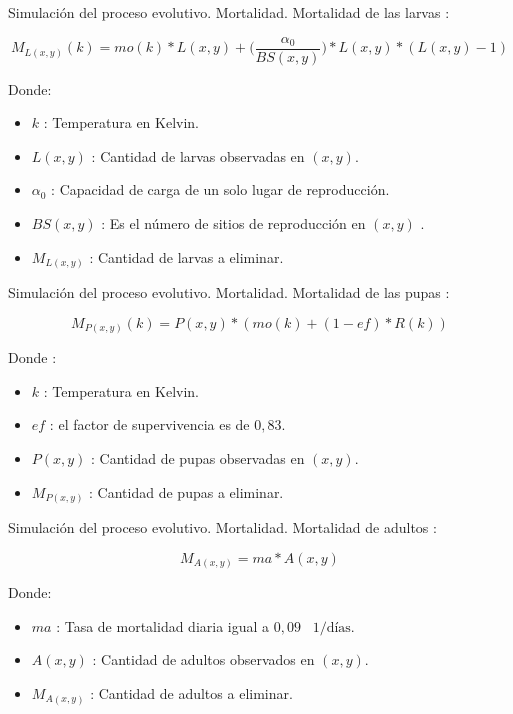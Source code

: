 \begin{frame}[c]{Simulación del proceso evolutivo. Mortalidad.}
Mortalidad de las larvas :
  \begin{center}
      \begin{equation}
      M_{L(x,y)}(k) = mo(k) * L(x,y) + \bigg(\frac{\alpha _{0}}{BS(x,y)}\bigg) * L(x,y) *(L(x,y) - 1)
    \end{equation}
  \end{center}
  Donde:
 \begin{itemize}
      \item $k$ : Temperatura en Kelvin.
      \item $L(x, y)$ : Cantidad de larvas observadas en $(x,y)$.
      \item $\alpha _{0}$ : Capacidad de carga de un solo lugar de reproducción.
      \item $BS(x,y)$ : Es el número de sitios de reproducción en $(x,y)$ .
      \item $M_{L(x,y)}$ : Cantidad de larvas a eliminar.
    \end{itemize}
\end{frame}

\begin{frame}[c]{Simulación del proceso evolutivo. Mortalidad.}
Mortalidad de las pupas :
\begin{center}
  \begin{equation}
      M_{P(x,y)}(k) = P(x,y) * (mo(k) + (1 - ef) * R(k))
  \end{equation}
\end{center}
Donde :
  \begin{itemize}
    \item $k$ : Temperatura en Kelvin.
    \item $ef$ : el factor de supervivencia es de $0,83$.
    \item $P(x, y)$ : Cantidad de pupas observadas en $(x,y)$.
    \item $M_{P(x,y)}$ : Cantidad de pupas a eliminar.
  \end{itemize}
\end{frame}

\begin{frame}[c]{Simulación del proceso evolutivo. Mortalidad.}
  Mortalidad de adultos :
  \begin{center}
    \begin{equation}
        M_{A(x,y)} = ma * A(x,y)
    \end{equation}
  \end{center}
  Donde:
    \begin{itemize}
      \item $ma$ : Tasa de mortalidad diaria igual a $0,09$ \ $1/\text{días}$.
      \item $A(x, y)$ : Cantidad de adultos observados en $(x,y)$.
      \item $M_{A(x,y)}$ : Cantidad de adultos a eliminar.
    \end{itemize}
\end{frame}


